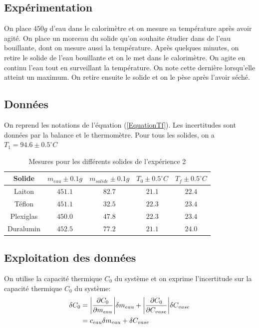 \documentclass[12pt]{article}
\begin{document}
\subsection{Expérimentation}

On place $450g$ d'eau dans le calorimètre et on mesure sa température après avoir agité. On place un morceau du solide qu'on souhaite étudier dans de l'eau bouillante, dont on mesure aussi la température. 
Après quelques minutes, on retire le solide de l'eau bouillante et on le met dans le calorimètre. 
On agite en continu l'eau tout en surveillant la température. On note cette dernière lorsqu'elle atteint un maximum. 
On retire ensuite le solide et on le pèse après l'avoir séché.

\subsection{Données}
On reprend les notations de l'équation (\ref{EquationTf}). Les incertitudes sont données par la balance et le thermomètre. Pour tous les solides, on a $T_1=94.6\pm 0.5^{\circ}C$
\begin{table}[h!]
	\begin{center}
		\begin{tabular}{|c|c|c|c|c|}
		\hline
		Solide & $m_{eau} \pm 0.1g$ & $m_{solide}\pm 0.1g$ & $T_0\pm 0.5^{\circ}C$ & $T_f\pm 0.5^{\circ}C$\\ \hline
		Laiton & $451.1$ & $82.7$ & $21.1$ & $22.4$ \\
		Téflon & $451.1$ & $32.5$ & $22.3$ & $23.4$ \\
		Plexiglas & $450.0$ & $47.8$ & $22.3$ & $23.4$ \\
		Duralumin & $452.5$ & $77.2$ & $21.1$ & $24.0$ \\ \hline
		\end{tabular}
		\caption{Mesures pour les différents solides de l'expérience 2}
		\label{table:mesureexp2}
	\end{center}
\end{table}

\subsection{Exploitation des données}
On utilise la capacité thermique $C_0$ du système et on exprime l'incertitude sur la capacité thermique $C_0$ du système:
\begin{align*}
\delta C_0&= \abs{\frac{\partial C_0}{\partial m_{eau}}} \delta m_{eau} + \abs{\frac{\partial C_0}{\partial C_{vase}}} \delta C_{vase}\\
&=c_{eau}\delta m_{eau}+\delta C_{vase}
\end{align*}
\end{document}
